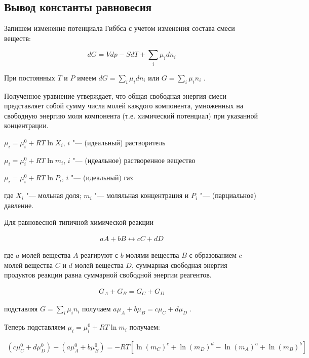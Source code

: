 \documentclass[12pt,a4paper,oneside]{book}
\begin{document}
\subsection{Вывод константы равновесия}

Запишем изменение потенциала Гиббса с учетом изменения состава смеси веществ:

\begin{equation}
	dG = V dp - S dT + \sum_i \mu_i d n_i
\end{equation}

При постоянных $T$ и $P$ имеем $d G = \sum_i \mu_i d n_i$   или $ G = \sum_i \mu_i n_i$ .

Полученное уравнение утверждает, что общая свободная энергия смеси представляет собой сумму числа молей каждого компонента, умноженных на свободную энергию моля компонента (т.е. химический потенциал) при указанной концентрации.

$ \mu_i = \mu_{i}^{0} + RT \ln X_i $,  $i$  "--- (идеальный) растворитель
 
$ \mu_i = \mu_{i}^{0} + RT \ln m_i $,  $i$  "--- (идеальное)  растворенное вещество

$ \mu_i = \mu_{i}^{0} + RT \ln P_i $,  $i$  "--- (идеальный)  газ

где $X_i$ "--- мольная доля; $m_i$ "--- моляльная концентрация и $P_i$ "--- (парциальное) давление.

Для равновесной типичной химической реакции

\begin{align}
	aA + bB \leftrightarrow cC + dD
\end{align}

где $a$ молей вещества $A$ реагируют с $b$ молями вещества $B$ с образованием $c$ молей вещества $C$ и $d$ молей вещества $D$, суммарная свободная энергия продуктов реакции равна суммарной свободной энергии реагентов.

\begin{align}
	G_A + G_B = G_C + G_D
\end{align}

подставляя $G = \sum_i \mu_i n_i$ получаем $a\mu_A + b\mu_B = c\mu_C + d\mu_D$ .

Теперь подставляем $ \mu_i = \mu_{i}^{0} + RT \ln m_i $ получаем: 

\begin{align}
(c \mu_{C}^{0} + d \mu_{D}^{0}) -(a \mu_{A}^{0} + b \mu_{B}^{0}) = - RT [\ln {(m_C)^c} + \ln {(m_D)^d} - \ln {(m_A)^a} + \ln {(m_B)^b}]
\end{align}
\end{document}
